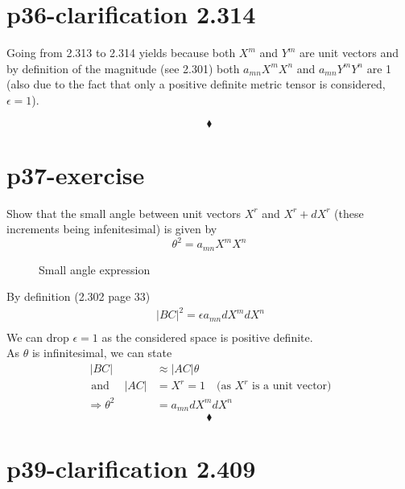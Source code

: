 \section{p36-clarification 2.314}
\begin{tcolorbox}
Going from 2.313 to 2.314 yields because both $X^m$ and $Y^m$ are unit vectors and by definition of the magnitude (see 2.301) both  $a_{mn}X^mX^n$ and $a_{mn}Y^mY^n$ are 1 (also due to the fact that only a positive definite metric tensor is considered, $\epsilon = 1$).
\end{tcolorbox}
$$\blacklozenge$$
\newpage

\section{p37-exercise}

\begin{tcolorbox}
Show that the small angle between unit vectors $X^r$ and $X^r + dX^r$ (these increments being infenitesimal) is given by $$ \theta^2 = a_{mn}X^mX^n$$
\end{tcolorbox}
\begin{figure}[htp]  

    \centering
 

\caption{Small angle expression}
\end{figure}
By definition (2.302 page 33)
\begin{align} 
\ |BC|^2 =\epsilon a_{mn}dX^mdX^n\\
\end{align}
We can drop $\epsilon = 1$ as the considered space is positive definite.\\
As $\theta$ is infinitesimal, we can state
\begin{align}
\ |BC| &\approx |AC|\theta\\
\text{ and } \quad |AC| &= X^r = 1\quad  \text{(as } X^r \text{ is a unit vector)}\\
\Rightarrow \theta^2 &= a_{mn}dX^mdX^n
\end{align}
$$\blacklozenge$$
\newpage


\section{p39-clarification 2.409}

